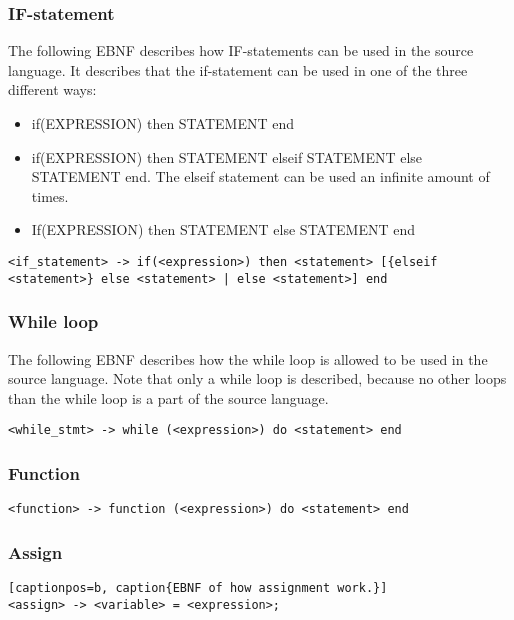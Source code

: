 \subsubsection*{IF-statement}
The following EBNF describes how IF-statements can be used in the source language. It describes that the if-statement can be used in one of the three different ways:
\begin{itemize}
	\item if(EXPRESSION) then STATEMENT end
	\item if(EXPRESSION) then STATEMENT elseif STATEMENT else STATEMENT end. The elseif statement can be used an infinite amount of times.
	\item If(EXPRESSION) then STATEMENT else STATEMENT end
\end{itemize}
\begin{lstlisting}[captionpos=b, caption={EBNF of the IF-statement in the source language}]
<if_statement> -> if(<expression>) then <statement> [{elseif <statement>} else <statement> | else <statement>] end
\end{lstlisting}


\subsubsection*{While loop}
The following EBNF describes how the while loop is allowed to be used in the source language. Note that only a while loop is described, because no other loops than the while loop is a part of the source language.
\begin{lstlisting}[captionpos=b, caption={EBNF of a while loop.}]
<while_stmt> -> while (<expression>) do <statement> end
\end{lstlisting}

\subsubsection*{Function}
\begin{lstlisting}[captionpos=b, caption={EBNF of a function.}]
<function> -> function (<expression>) do <statement> end
\end{lstlisting}

\subsubsection*{Assign}
\begin{lstlisting}[captionpos=b, caption{EBNF of how assignment work.}]
<assign> -> <variable> = <expression>;
\end{lstlisting}

